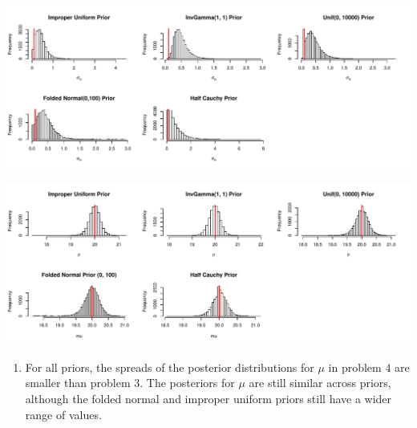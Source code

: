 \documentclass[12pt]{article}\usepackage[]{graphicx}\usepackage[]{color}
\newenvironment{knitrout}{}{} %
\begin{document}
\begin{doublespacing}
\begin{enumerate}
\begin{knitrout}\footnotesize
{}\color{fgcolor}
\includegraphics[width=\linewidth]{figure/plotpost4} 

\end{knitrout}


\begin{knitrout}\footnotesize
{}\color{fgcolor}
\includegraphics[width=\linewidth]{figure/plotmupost4} 

\end{knitrout}

\begin{enumerate}

\item For all priors, the spreads of the posterior distributions for $\mu$ in problem $4$ are smaller than problem $3$. The posteriors for $\mu$ are still similar across priors, although the folded normal and improper uniform priors still have a wider range of values. \\


\end{enumerate}
\end{enumerate}
\end{doublespacing}
\end{document}
